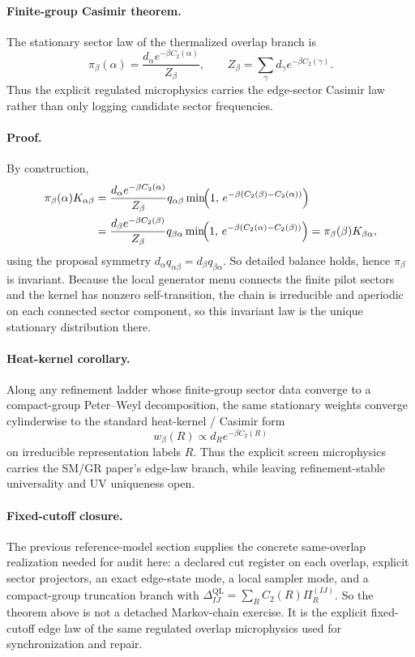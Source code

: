 \documentclass[11pt]{article}
\begin{document}
\paragraph{Finite-group Casimir theorem.}
The stationary sector law of the thermalized overlap branch is
\begin{equation}
\pi_\beta(\alpha)
=
\frac{d_\alpha e^{-\beta C_2(\alpha)}}{Z_\beta},
\qquad
Z_\beta=\sum_\gamma d_\gamma e^{-\beta C_2(\gamma)}.
\end{equation}
Thus the explicit regulated microphysics carries the edge-sector Casimir law rather
than only logging candidate sector frequencies.

\paragraph{Proof.}
By construction,
\begin{align}
\pi_\beta(\alpha)K_{\alpha\beta}
&=
\frac{d_\alpha e^{-\beta C_2(\alpha)}}{Z_\beta}
q_{\alpha\beta}
\min\!\Bigl(
1,\,
e^{-\beta(C_2(\beta)-C_2(\alpha))}
\Bigr)\\
&=
\frac{d_\beta e^{-\beta C_2(\beta)}}{Z_\beta}
q_{\beta\alpha}
\min\!\Bigl(
1,\,
e^{-\beta(C_2(\alpha)-C_2(\beta))}
\Bigr)
=
\pi_\beta(\beta)K_{\beta\alpha},
\end{align}
using the proposal symmetry $d_\alpha q_{\alpha\beta}=d_\beta q_{\beta\alpha}$. So detailed
balance holds, hence $\pi_\beta$ is invariant. Because the local generator menu connects the
finite pilot sectors and the kernel has nonzero self-transition, the chain is irreducible and
aperiodic on each connected sector component, so this invariant law is the unique stationary
distribution there.

\paragraph{Heat-kernel corollary.}
Along any refinement ladder whose finite-group sector data converge to a compact-group
Peter--Weyl decomposition, the same stationary weights converge cylinderwise to the standard
heat-kernel / Casimir form
\begin{equation}
w_\beta(R)\propto d_R e^{-\beta C_2(R)}
\end{equation}
on irreducible representation labels $R$. Thus the explicit screen microphysics carries the
SM/GR paper's edge-law branch, while leaving refinement-stable
universality and UV uniqueness open.

\paragraph{Fixed-cutoff closure.}
The previous reference-model section supplies the concrete same-overlap realization needed for
audit here: a declared cut register on each overlap, explicit sector projectors, an exact
edge-state mode, a local sampler mode, and a compact-group truncation branch with
$\Delta_{IJ}^{\mathrm{QL}}=\sum_R C_2(R)\Pi_R^{(IJ)}$. So the theorem above is not a detached
Markov-chain exercise. It is the explicit fixed-cutoff edge law of the same regulated overlap
microphysics used for synchronization and repair.
\end{document}
